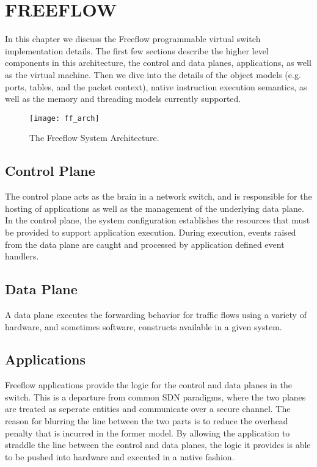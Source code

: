 \chapter{FREEFLOW}
\label{ff}
In this chapter we discuss the Freeflow programmable virtual switch
implementation details. The first few sections describe the higher level 
components in this architecture, the control and data planes, applications, as 
well as the virtual machine. Then we dive into the details of the object 
models (e.g. ports, tables, and the packet context), native instruction 
execution semantics, as well as the memory and threading models currently 
supported.

\begin{figure}[h]
\centering
\texttt{[image: ff\_arch]}
\caption{The Freeflow System Architecture.}
\label{ff_arch}
\end{figure}

\section{Control Plane}
\label{ff:cp}
The control plane acts as the brain in a network switch, and is responsible for
the hosting of applications as well as the management of the underlying data
plane. In the control plane, the system configuration establishes the resources
that must be provided to support application execution. During execution, 
events raised from the data plane are caught and processed by application 
defined event handlers.

\section{Data Plane}
\label{ff:dp}
A data plane executes the forwarding behavior for traffic flows using a variety
of hardware, and sometimes software, constructs available in a given system.

\section{Applications}
\label{ff:app}
Freeflow applications provide the logic for the control and data planes in the
switch. This is a departure from common SDN paradigms, where the two planes are
treated as seperate entities and communicate over a secure channel. The reason
for blurring the line between the two parts is to reduce the overhead penalty
that is incurred in the former model. By allowing the application to straddle
the line between the control and data planes, the logic it provides is able
to be pushed into hardware and executed in a native fashion.

